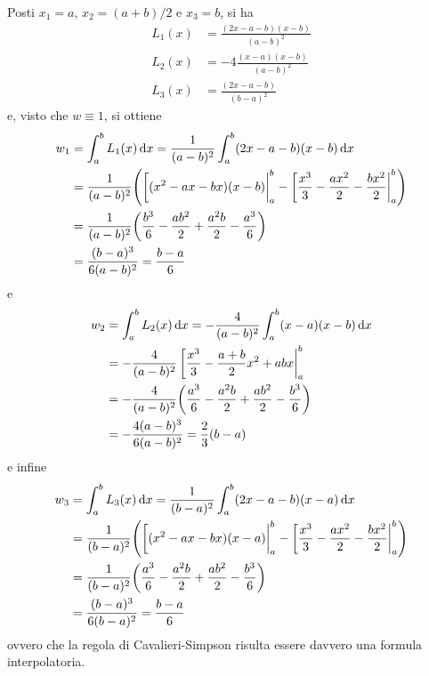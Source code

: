 	\begin{osservazione}
		Posti \(x_1 = a\), \(x_2 = (a + b) / 2\) e \(x_3 = b\), si ha
		\begin{align*}
			L_1 (x) &= \frac{(2 x - a - b) (x - b)}{(a - b)^2} \\
			L_2 (x) &= - 4 \frac{(x - a) (x - b)}{(a - b)^2} \\
			L_3 (x) &= \frac{(2 x - a - b)}{(b - a)^2}
		\end{align*}
		e, visto che \(w \equiv 1\), si ottiene
		\begin{equation*}
			\begin{split}
				w_1 &= \int_a^b L_1 (x) \dd{x} = \frac{1}{(a - b)^2} \int_a^b (2 x - a - b) (x - b) \dd{x} \\
				&= \frac{1}{(a - b)^2} \qty(\eval[(x^2 - a x - b x) (x - b)|_a^b - \eval[\frac{x^3}{3} - \frac{a x^2}{2} - \frac{b x^2}{2}|_a^b) \\
				&= \frac{1}{(a - b)^2} \qty(\frac{b^3}{6} - \frac{a b^2}{2} + \frac{a^2 b}{2} - \frac{a^3}{6}) \\
				&= \frac{(b - a)^3}{6 (a - b)^2} = \frac{b - a}{6}
			\end{split}
		\end{equation*}
		e
		\begin{equation*}
			\begin{split}
				w_2 &= \int_a^b L_2 (x) \dd{x} = - \frac{4}{(a - b)^2} \int_a^b (x - a) (x - b) \dd{x} \\
				&= - \frac{4}{(a - b)^2} \eval[\frac{x^3}{3} - \frac{a + b}{2} x^2 + a b x|_a^b \\
				&= - \frac{4}{(a - b)^2} \qty(\frac{a^3}{6} - \frac{a^2 b}{2} + \frac{a b^2}{2} - \frac{b^3}{6}) \\
				&= -\frac{4 (a - b)^3}{6 (a - b)^2} = \frac{2}{3} (b - a)
			\end{split}
		\end{equation*}
		e infine
		\begin{equation*}
			\begin{split}
				w_3 &= \int_a^b L_3 (x) \dd{x} = \frac{1}{(b - a)^2} \int_a^b (2 x - a - b) (x - a) \dd{x} \\
				&= \frac{1}{(b - a)^2} \qty(\eval[(x^2 - a x - b x) (x - a)|_a^b - \eval[\frac{x^3}{3} - \frac{a x^2}{2} - \frac{b x^2}{2}|_a^b) \\
				&= \frac{1}{(b - a)^2} \qty(\frac{a^3}{6} - \frac{a^2 b}{2} + \frac{a b^2}{2} - \frac{b^3}{6}) \\
				&= \frac{(b - a)^3}{6 (b - a)^2} = \frac{b - a}{6}
			\end{split}
		\end{equation*}
		ovvero che la regola di Cavalieri-Simpson risulta essere davvero una formula interpolatoria.
	\end{osservazione}

